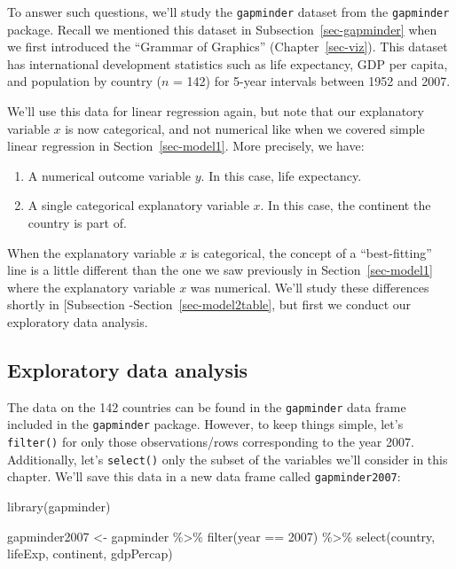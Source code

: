 \documentclass[
  letterpaper,
  DIV=11,
  numbers=noendperiod]{scrreprt}
\newenvironment{Shaded}{\begin{snugshade}}{\end{snugshade}}
\newcommand{\DecValTok}[1]{\textcolor[rgb]{0.68,0.00,0.00}{#1}}
\newcommand{\FunctionTok}[1]{\textcolor[rgb]{0.28,0.35,0.67}{#1}}
\newcommand{\NormalTok}[1]{\textcolor[rgb]{0.00,0.23,0.31}{#1}}
\newcommand{\OtherTok}[1]{\textcolor[rgb]{0.00,0.23,0.31}{#1}}
\newcommand{\SpecialCharTok}[1]{\textcolor[rgb]{0.37,0.37,0.37}{#1}}
\theoremstyle{definition}
\theoremstyle{remark}
\begin{document}
To answer such questions, we'll study the \texttt{gapminder} dataset
from the \texttt{gapminder} package. Recall we mentioned this dataset in
Subsection~\ref{sec-gapminder} when we first introduced the ``Grammar of
Graphics'' (Chapter~\ref{sec-viz}). This dataset has international
development statistics such as life expectancy, GDP per capita, and
population by country (\(n\) = 142) for 5-year intervals between 1952
and 2007.

We'll use this data for linear regression again, but note that our
explanatory variable \(x\) is now categorical, and not numerical like
when we covered simple linear regression in Section~\ref{sec-model1}.
More precisely, we have:

\begin{enumerate}
\def\labelenumi{\arabic{enumi}.}
\item
  A numerical outcome variable \(y\). In this case, life expectancy.
\item
  A single categorical explanatory variable \(x\). In this case, the
  continent the country is part of.
\end{enumerate}

When the explanatory variable \(x\) is categorical, the concept of a
``best-fitting'' line is a little different than the one we saw
previously in Section~\ref{sec-model1} where the explanatory variable
\(x\) was numerical. We'll study these differences shortly in
{[}Subsection -Section~\ref{sec-model2table}, but first we conduct our
exploratory data analysis.

\hypertarget{sec-model2EDA}{%
\subsection{Exploratory data analysis}\label{sec-model2EDA}}

The data on the 142 countries can be found in the \texttt{gapminder}
data frame included in the \texttt{gapminder} package. However, to keep
things simple, let's \texttt{filter()} for only those observations/rows
corresponding to the year 2007. Additionally, let's \texttt{select()}
only the subset of the variables we'll consider in this chapter. We'll
save this data in a new data frame called \texttt{gapminder2007}:

\begin{Shaded}
\begin{Highlighting}[]
\FunctionTok{library}\NormalTok{(gapminder)}

\NormalTok{gapminder2007 }\OtherTok{\textless{}{-}}\NormalTok{ gapminder }\SpecialCharTok{\%\textgreater{}\%}
  \FunctionTok{filter}\NormalTok{(year }\SpecialCharTok{==} \DecValTok{2007}\NormalTok{) }\SpecialCharTok{\%\textgreater{}\%}
  \FunctionTok{select}\NormalTok{(country, lifeExp, continent, gdpPercap)}
\end{Highlighting}
\end{Shaded}
\end{document}
